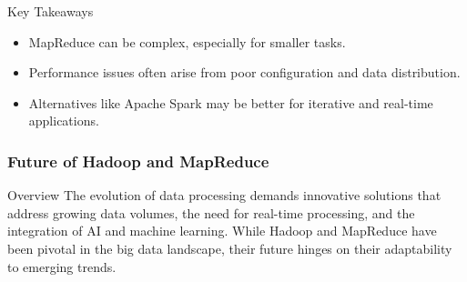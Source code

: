 \documentclass[aspectratio=169]{beamer}
\begin{document}
\begin{frame}{Key Takeaways}
    \begin{itemize}
        \item MapReduce can be complex, especially for smaller tasks.
        \item Performance issues often arise from poor configuration and data distribution.
        \item Alternatives like Apache Spark may be better for iterative and real-time applications.
    \end{itemize}
\end{frame}

\begin{frame}[fragile]
    \frametitle{Future of Hadoop and MapReduce}
    \begin{block}{Overview}
        The evolution of data processing demands innovative solutions that address growing data volumes, the need for real-time processing, and the integration of AI and machine learning. While Hadoop and MapReduce have been pivotal in the big data landscape, their future hinges on their adaptability to emerging trends.
    \end{block}
\end{frame}
\end{document}
